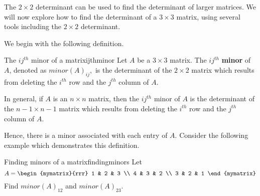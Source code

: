 The $2 \times 2$ determinant can be used to find the determinant of larger matrices.
We will now explore how to find the determinant of a $3 \times 3$ matrix, using several tools
including the $2 \times 2$ determinant.

We begin with the following definition. 

\begin{definition}{The $ij^{th}$ minor of a matrix}{ijthminor}
Let $A$ be a $3\times 3$ matrix. The $ij^{th}$ \textbf{minor} of $A$, denoted as $minor\left( A\right) _{ij},$ is the determinant
of the $2\times 2$ matrix which results from deleting the $i^{th}$ row and
the $j^{th}$ column of $A$.

In general, if $A$ is an $n\times n$ matrix, then the $ij^{th}$ minor of $A$ is the determinant of the $n-1 \times n-1$ matrix which results from deleting the $i^{th}$ row and the $j^{th}$ column of $A$. 
\end{definition}

Hence, there is a minor associated with each entry of $A$. Consider the following example which demonstrates this definition. 

\begin{example}{Finding minors of a matrix}{findingminors}
Let 
\begin{equation*}
A = \begin{mymatrix}{rrr}
1 & 2 & 3 \\
4 & 3 & 2 \\
3 & 2 & 1
\end{mymatrix} 
\end{equation*}
Find $minor\left( A\right) _{12}$ and $minor\left( A\right) _{23}$.
\end{example}

